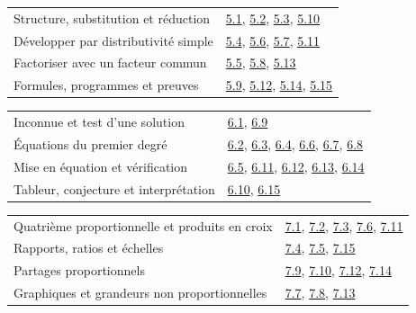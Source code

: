 \begin{tabularx}{\linewidth}{@{}Yl@{}}\toprule
Structure, substitution et réduction & \hyperref[exo-5-1]{5.1}, \hyperref[exo-5-2]{5.2}, \hyperref[exo-5-3]{5.3}, \hyperref[exo-5-10]{5.10}\\[2mm]
Développer par distributivité simple & \hyperref[exo-5-4]{5.4}, \hyperref[exo-5-6]{5.6}, \hyperref[exo-5-7]{5.7}, \hyperref[exo-5-11]{5.11}\\[2mm]
Factoriser avec un facteur commun & \hyperref[exo-5-5]{5.5}, \hyperref[exo-5-8]{5.8}, \hyperref[exo-5-13]{5.13}\\[2mm]
Formules, programmes et preuves & \hyperref[exo-5-9]{5.9}, \hyperref[exo-5-12]{5.12}, \hyperref[exo-5-14]{5.14}, \hyperref[exo-5-15]{5.15}\\[2mm]
\bottomrule\end{tabularx}\par\vspace{4mm}
\begin{tabularx}{\linewidth}{@{}Yl@{}}\toprule
Inconnue et test d’une solution & \hyperref[exo-6-1]{6.1}, \hyperref[exo-6-9]{6.9}\\[2mm]
Équations du premier degré & \hyperref[exo-6-2]{6.2}, \hyperref[exo-6-3]{6.3}, \hyperref[exo-6-4]{6.4}, \hyperref[exo-6-6]{6.6}, \hyperref[exo-6-7]{6.7}, \hyperref[exo-6-8]{6.8}\\[2mm]
Mise en équation et vérification & \hyperref[exo-6-5]{6.5}, \hyperref[exo-6-11]{6.11}, \hyperref[exo-6-12]{6.12}, \hyperref[exo-6-13]{6.13}, \hyperref[exo-6-14]{6.14}\\[2mm]
Tableur, conjecture et interprétation & \hyperref[exo-6-10]{6.10}, \hyperref[exo-6-15]{6.15}\\[2mm]
\bottomrule\end{tabularx}\par\vspace{4mm}
\clearpage
{}\fontsize{10}{13}\selectfont
{}\begin{tabularx}{\linewidth}{@{}Yl@{}}\toprule
Quatrième proportionnelle et produits en croix & \hyperref[exo-7-1]{7.1}, \hyperref[exo-7-2]{7.2}, \hyperref[exo-7-3]{7.3}, \hyperref[exo-7-6]{7.6}, \hyperref[exo-7-11]{7.11}\\[2mm]
Rapports, ratios et échelles & \hyperref[exo-7-4]{7.4}, \hyperref[exo-7-5]{7.5}, \hyperref[exo-7-15]{7.15}\\[2mm]
Partages proportionnels & \hyperref[exo-7-9]{7.9}, \hyperref[exo-7-10]{7.10}, \hyperref[exo-7-12]{7.12}, \hyperref[exo-7-14]{7.14}\\[2mm]
Graphiques et grandeurs non proportionnelles & \hyperref[exo-7-7]{7.7}, \hyperref[exo-7-8]{7.8}, \hyperref[exo-7-13]{7.13}\\[2mm]
\bottomrule\end{tabularx}\par\vspace{4mm}
